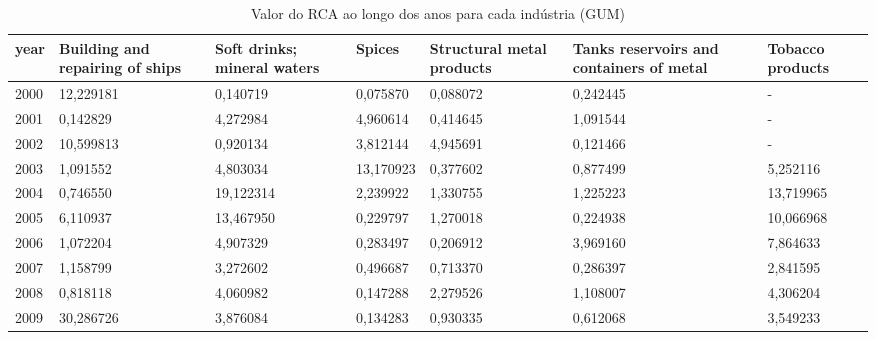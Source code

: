 \begin{table}
\centering
\caption{Valor do RCA ao longo dos anos para cada indústria (GUM)}
\begin{tabular}{p{1cm}p{2cm}p{2cm}p{2cm}p{2cm}p{2cm}p{2cm}}
\toprule
 year &  Building and repairing of ships &  Soft drinks; mineral waters &    Spices &  Structural metal products &  Tanks reservoirs and containers of metal &  Tobacco products \\
\midrule
 2000 &                        12,229181 &                     0,140719 &  0,075870 &                   0,088072 &                                  0,242445 &                 - \\
 2001 &                         0,142829 &                     4,272984 &  4,960614 &                   0,414645 &                                  1,091544 &                 - \\
 2002 &                        10,599813 &                     0,920134 &  3,812144 &                   4,945691 &                                  0,121466 &                 - \\
 2003 &                         1,091552 &                     4,803034 & 13,170923 &                   0,377602 &                                  0,877499 &          5,252116 \\
 2004 &                         0,746550 &                    19,122314 &  2,239922 &                   1,330755 &                                  1,225223 &         13,719965 \\
 2005 &                         6,110937 &                    13,467950 &  0,229797 &                   1,270018 &                                  0,224938 &         10,066968 \\
 2006 &                         1,072204 &                     4,907329 &  0,283497 &                   0,206912 &                                  3,969160 &          7,864633 \\
 2007 &                         1,158799 &                     3,272602 &  0,496687 &                   0,713370 &                                  0,286397 &          2,841595 \\
 2008 &                         0,818118 &                     4,060982 &  0,147288 &                   2,279526 &                                  1,108007 &          4,306204 \\
 2009 &                        30,286726 &                     3,876084 &  0,134283 &                   0,930335 &                                  0,612068 &          3,549233 \\

\end{tabular}
\end{table}
